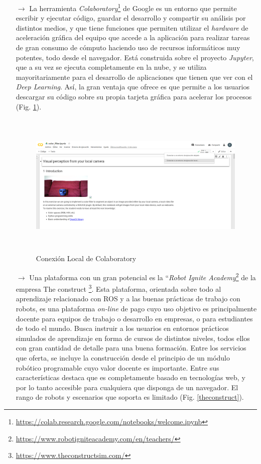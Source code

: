 \begin{itemize}

\item [$\rightarrow$] La herramienta \textit{Colaboratory}\footnote{\url{https://colab.research.google.com/notebooks/welcome.ipynb}} de Google es un entorno que permite escribir y ejecutar código, guardar el desarrollo y compartir su análisis por distintos medios, y que tiene funciones que permiten utilizar el \textit{hardware} de aceleración gráfica del equipo que accede a la aplicación para realizar tareas de gran consumo de cómputo haciendo uso de recursos informáticos muy potentes, todo desde el navegador. Está construida sobre el proyecto \textit{Jupyter}, que a su vez se ejecuta completamente en la nube, y se utiliza mayoritariamente para el desarrollo  de aplicaciones que tienen que ver con el \textit{Deep Learning}. Así, la gran ventaja que ofrece es que permite a los usuarios descargar su código sobre su propia tarjeta gráfica para acelerar los procesos (Fig. \ref{colab}).
\begin{figure}[!htbp]  \centering\noindent
    \includegraphics[width=0.99\textwidth,height=7cm]{figures/colab.png}
    \caption{Conexión Local de Colaboratory}
    \label{colab}
\end{figure}
\item [$\rightarrow$]Una plataforma con un gran potencial es la ``\textit{Robot Ignite Academy}\footnote{\url{https://www.robotigniteacademy.com/en/teachers/}} de la empresa The construct \footnote{\url{https://www.theconstructsim.com/}}. Esta plataforma, orientada sobre todo al aprendizaje relacionado con ROS y a las buenas prácticas de trabajo con robots, es una plataforma \textit{on-line} de pago cuyo uso objetivo es principalmente docente para equipos de trabajo o desarrollo en empresas, o para estudiantes de todo el mundo. Busca instruir a los usuarios en entornos prácticos simulados de aprendizaje en forma de cursos de distintos niveles, todos ellos con gran cantidad de detalle para una buena formación. Entre los servicios que oferta, se incluye la construcción desde el principio de un módulo robótico programable cuyo valor docente es importante. Entre sus características destaca que es completamente basado en tecnologías web, y por lo tanto accesible para cualquiera que disponga de un navegador. El rango de robots y escenarios que soporta es limitado (Fig. \ref{theconstruct}).

\end{itemize}
